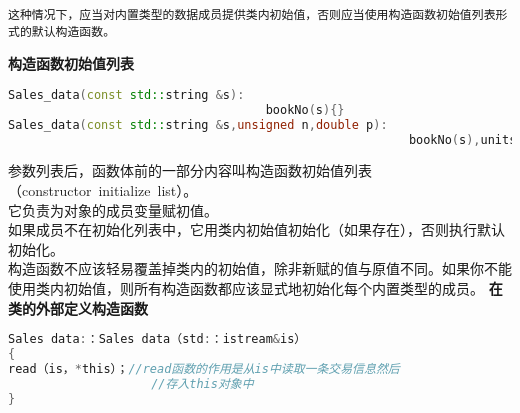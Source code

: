 \documentclass[
  a4paper,
  oneside,tablecaptionabove
]{scrbook}
\begin{document}
\begin{lstlisting}
这种情况下，应当对内置类型的数据成员提供类内初始值，否则应当使用构造函数初始值列表形式的默认构造函数。  
\end{lstlisting}

\textbf{构造函数初始值列表}

\begin{lstlisting}[language={C++}]
Sales_data(const std::string &s):
                                    bookNo(s){}
Sales_data(const std::string &s,unsigned n,double p):
                                                        bookNo(s),units_sold(n),revenue(p*n){}
\end{lstlisting}

参数列表后，函数体前的一部分内容叫构造函数初始值列表（constructor~initialize~list）。\\
它负责为对象的成员变量赋初值。\\
如果成员不在初始化列表中，它用类内初始值初始化（如果存在），否则执行默认初始化。\\
构造函数不应该轻易覆盖掉类内的初始值，除非新赋的值与原值不同。如果你不能使用类内初始值，则所有构造函数都应该显式地初始化每个内置类型的成员。
\textbf{在类的外部定义构造函数}

\begin{lstlisting}[language={C++}]
Sales data:：Sales data（std:：istream&is）
{
read（is，*this）；//read函数的作用是从is中读取一条交易信息然后
                    //存入this对象中
}
\end{lstlisting}
\end{document}
